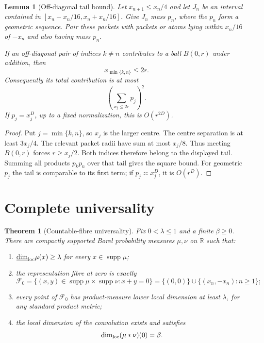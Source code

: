 \documentclass[11pt]{article}
\newtheorem{theorem}{Theorem}
\newtheorem{lemma}{Lemma}
\newcommand{\ldim}{\underline{\operatorname{dim}}_{\rm loc}}
\newcommand{\supp}{\operatorname{supp}}
\begin{document}
\begin{lemma}[Off-diagonal tail bound]\label{lem:tail}
Let $x_{n+1}\leq x_n/4$ and let $J_n$ be an interval contained in
$[x_n-x_n/16,x_n+x_n/16]$.  Give $J_n$ mass $p_n$, where the $p_n$ form a
geometric sequence.  Pair these packets with packets or atoms lying within
$x_n/16$ of $-x_n$ and also having mass $p_n$.

If an off-diagonal pair of indices $k\neq n$ contributes to a ball
$B(0,r)$ under addition, then
\[
 x_{\min\{k,n\}}\leq2r.
\]
Consequently its total contribution is at most
\[
 \left(\sum_{x_j\leq2r}p_j\right)^2.
\]
If $p_j=x_j^D$, up to a fixed normalization, this is $O(r^{2D})$.
\end{lemma}

\begin{proof}
Put $j=\min\{k,n\}$, so $x_j$ is the larger centre.  The centre separation is
at least $3x_j/4$.  The relevant packet radii have sum at most $x_j/8$.
Thus meeting $B(0,r)$ forces $r\geq x_j/2$.  Both indices therefore belong
to the displayed tail.  Summing all products $p_kp_n$ over that tail gives
the square bound.  For geometric $p_j$ the tail is comparable to its first
term; if $p_j\asymp x_j^D$, it is $O(r^D)$.
\end{proof}

\section{Complete universality}

\begin{theorem}[Countable-fibre universality]\label{thm:universal}
Fix $0<\lambda\leq1$ and a finite $\beta\geq0$.  There are compactly
supported Borel probability measures $\mu,\nu$ on $\mathbb R$ such that:
\begin{enumerate}[label=\textup{(\roman*)}]
\item $\ldim\mu(x)\geq\lambda$ for every $x\in\supp\mu$;
\item the representation fibre at zero is exactly
\[
 \mathcal F_0=
 \{(x,y)\in\supp\mu\times\supp\nu:x+y=0\}
 =\{(0,0)\}\cup\{(x_n,-x_n):n\geq1\};
\]
\item every point of $\mathcal F_0$ has product-measure lower local dimension
at least $\lambda$, for any standard product metric;
\item the local dimension of the convolution exists and satisfies
\[
 \dim_{\rm loc}(\mu*\nu)(0)=\beta.
\]
\end{enumerate}
\end{theorem}
\end{document}
